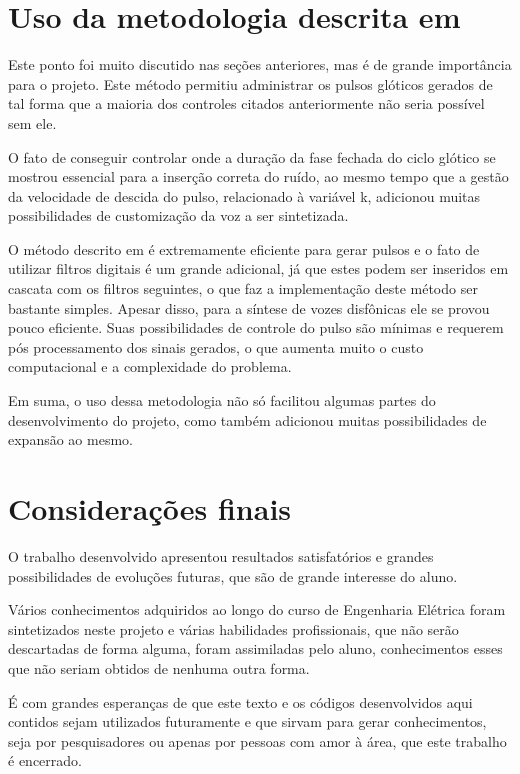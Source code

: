 \documentclass[
  12pt,       
  openright,      
  twoside,      
  a4paper,      
  english,      
  french,       
  spanish,      
  brazil,     
  ]{abntex2}
\begin{document}
\section{Uso da metodologia descrita em }
Este ponto foi muito discutido nas seções anteriores, mas é de grande importância para o projeto. Este método permitiu administrar os pulsos glóticos gerados de tal forma que a maioria dos controles citados anteriormente não seria possível sem ele.

O fato de conseguir controlar onde a duração da fase fechada do ciclo glótico se mostrou essencial para a inserção correta do ruído, ao mesmo tempo que a gestão da velocidade de descida do pulso, relacionado à variável k, adicionou muitas possibilidades de customização da voz a ser sintetizada.

O método descrito em  é extremamente eficiente para gerar pulsos e o fato de utilizar filtros digitais é um grande adicional, já que estes podem ser inseridos em cascata com os filtros seguintes, o que faz a implementação deste método ser bastante simples. Apesar disso, para a síntese de vozes disfônicas ele se provou pouco eficiente. Suas possibilidades de controle do pulso são mínimas e requerem pós processamento dos sinais gerados, o que aumenta muito o custo computacional e a complexidade do problema.

Em suma, o uso dessa metodologia não só facilitou algumas partes do desenvolvimento do projeto, como também adicionou muitas possibilidades de expansão ao mesmo.

\section{Considerações finais}
O trabalho desenvolvido apresentou resultados satisfatórios e grandes possibilidades de evoluções futuras, que são de grande interesse do aluno.

Vários conhecimentos adquiridos ao longo do curso de Engenharia Elétrica foram sintetizados neste projeto e várias habilidades profissionais, que não serão descartadas de forma alguma, foram assimiladas pelo aluno, conhecimentos esses que não seriam obtidos de nenhuma outra forma.

É com grandes esperanças de que este texto e os códigos desenvolvidos aqui contidos sejam utilizados futuramente e que sirvam para gerar conhecimentos, seja por pesquisadores ou apenas por pessoas com amor à área, que este trabalho é encerrado.
\end{document}
